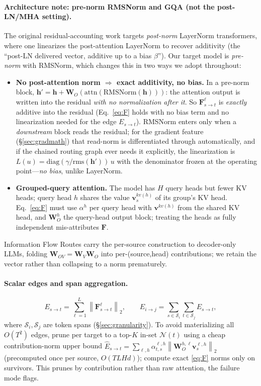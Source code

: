 \documentclass[11pt]{article}
\newcommand{\F}{\mathbf{F}}
\newcommand{\WO}{\mathbf{W}_O}
\newcommand{\WV}{\mathbf{W}_V}
\newcommand{\WOV}{\mathbf{W}_{OV}}
\newcommand{\vv}{\mathbf{v}}
\newcommand{\hh}{\mathbf{h}}
\newcommand{\norm}[1]{\left\lVert #1 \right\rVert}
\newcommand{\Span}{\mathcal S}
\begin{document}
\paragraph{Architecture note: pre-norm RMSNorm and GQA (not the post-LN/MHA setting).}
The original residual-accounting work \cite{kobayashi2021incorporating} targets \emph{post-norm}
LayerNorm transformers, where one linearizes the post-attention LayerNorm to recover additivity (the
``post-LN delivered vector, additive up to a bias $\beta$''). Our target model is \emph{pre-norm} with
RMSNorm, which changes this in two ways we adopt throughout:
\begin{itemize}[leftmargin=1.4em,itemsep=2pt]
\item \textbf{No post-attention norm $\Rightarrow$ exact additivity, no bias.} In a pre-norm block,
$\hh'=\hh+\WO(\mathrm{attn}(\mathrm{RMSNorm}(\hh)))$: the attention output is written into the residual
\emph{with no normalization after it}. So $\F^{\ell}_{s\to t}$ is \emph{exactly} additive into the
residual (Eq.~\ref{eq:F} holds with no bias term and no linearization needed for the edge
$E_{s\to t}$). RMSNorm enters only when a \emph{downstream} block reads the residual; for the gradient
feature (\S\ref{sec:gradmath}) that read-norm is differentiated through automatically, and if the
chained routing graph ever needs it explicitly, the linearization is $L(u)=\mathrm{diag}(\gamma/\mathrm{rms}(\hh'))\,u$
with the denominator frozen at the operating point---\emph{no bias}, unlike LayerNorm.
\item \textbf{Grouped-query attention.} The model has $H$ query heads but fewer KV heads; query head
$h$ shares the value $\vv^{kv(h)}_s$ of its group's KV head. Eq.~\eqref{eq:F} must use $\alpha^{h}$ per
query head with $\vv^{kv(h)}$ from the shared KV head, and $\WO^{h}$ the query-head output block;
treating the heads as fully independent mis-attributes $\F$.
\end{itemize}
Information Flow Routes \cite{ferrando2024information} carry the per-source construction to
decoder-only LLMs, folding $\WOV=\WV\WO$ into per-(source,head) contributions; we retain the vector
rather than collapsing to a norm prematurely.

\paragraph{Scalar edges and span aggregation.}
\begin{equation}
E_{s\to t}=\sum_{\ell=1}^{L}\norm{\F^{\ell}_{s\to t}}_2,
\qquad
E_{i\to j}=\sum_{s\in\Span_i}\sum_{t\in\Span_j}E_{s\to t},
\label{eq:edge}
\end{equation}
where $\Span_i,\Span_j$ are token spans (\S\ref{sec:granularity}). To avoid materializing all
$O(T^2)$ edges, prune per target to a top-$K$ in-set $\mathcal N(t)$ using a cheap contribution-norm
upper bound $\widehat E_{s\to t}=\sum_{\ell,h}\alpha^{\ell,h}_{t,s}\norm{\WO^{h,\ell}\vv^{\ell,h}_s}_2$
(precomputed once per source, $O(TLHd)$); compute exact \eqref{eq:F} norms only on survivors. This
prunes by contribution rather than raw attention, the failure mode \cite{guo2024attention} flags.
\end{document}
